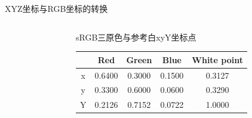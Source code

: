 \documentclass{beamer}
\begin{document}
\begin{frame}[t]{XYZ坐标与RGB坐标的转换}
\begin{columns}
	\begin{column}[c]{0.35\textwidth}
	\end{column}
	\begin{column}[c]{0.65\textwidth}
		\begin{minipage}[c][0.8\textheight][c]{\linewidth}
			\small\centering
			\mbox{\mbox{sRGB}三原色与参考白\mbox{xyY}坐标点}
			\begin{tabular}[t]{|ccccc|}
				\hline
				& Red & Green & Blue & White point \\
				\hline
				x & 0.6400 & 0.3000 & 0.1500 & 0.3127 \\
				\hline
				y	& 0.3300 & 0.6000 & 0.0600 & 0.3290 \\
				\hline
				Y	& 0.2126 & 0.7152 & 0.0722 & 1.0000 \\
				\hline
			\end{tabular}
		\begin{equation*}

\end{equation*}
\end{minipage}
\end{column}
\end{columns}
\end{frame}
\end{document}

